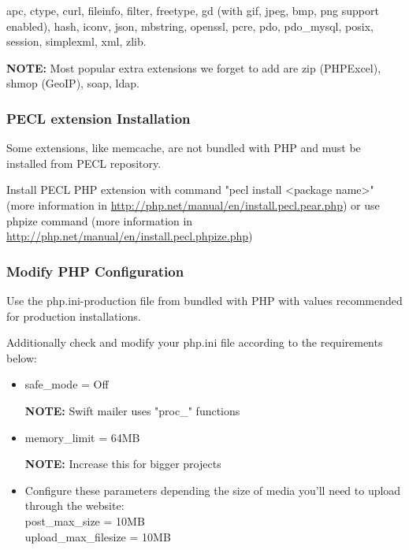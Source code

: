 \documentclass[12pt]{article}
\newcommand{\vigShowNotes}{1}
\newcommand{\note}[1]{
\textbf{NOTE:} 
#1
}
\begin{document}
\textsf{apc}, \textsf{ctype}, \textsf{curl}, \textsf{fileinfo}, \textsf{filter}, \textsf{freetype}, \textsf{gd} (with gif, jpeg, bmp, png support enabled), \textsf{hash}, \textsf{iconv}, \textsf{json}, \textsf{mbstring}, \textsf{openssl}, \textsf{pcre}, \textsf{pdo}, \textsf{pdo\_mysql}, \textsf{posix}, \textsf{session}, \textsf{simplexml}, \textsf{xml}, \textsf{zlib}.

\note{Most popular extra extensions we forget to add are \textsf{zip} (PHPExcel), \textsf{shmop} (GeoIP), \textsf{soap}, \textsf{ldap}.}

\subsubsection{PECL extension Installation}
Some extensions, like \textsf{memcache}, are not bundled with PHP and must be installed from PECL repository.

Install PECL PHP extension with command "pecl install <package name>" (more information in \url{http://php.net/manual/en/install.pecl.pear.php}) or use phpize command (more information in \url{http://php.net/manual/en/install.pecl.phpize.php})

\subsubsection{Modify PHP Configuration}

Use the php.ini-production file from bundled with PHP with values recommended for production installations.

Additionally check and modify your php.ini file according to the requirements below:

\begin{itemize}
	\item \textsf{safe\_mode = Off}
	
	\note{Swift mailer uses "proc\_\*" functions}
	
	\item \textsf{memory\_limit = 64MB}
	
	\note{Increase this for bigger projects}
	
	\item Configure these parameters depending the size of media you'll need to upload through the website:
	\\ \textsf{post\_max\_size = 10MB}
	\\ \textsf{upload\_max\_filesize = 10MB}
	
\end{itemize}
\end{document}
